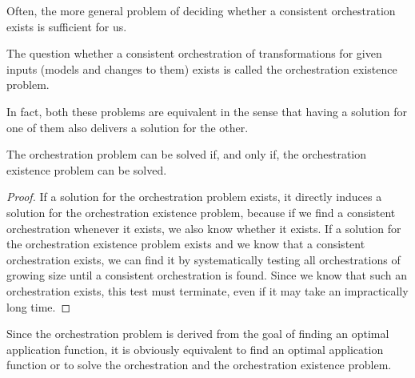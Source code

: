 Often, the more general problem of deciding whether a consistent orchestration exists is sufficient for us.
\begin{definition}
    \label{def:orchestrationexistenceproblem}
    The question whether a consistent orchestration of transformations for given inputs (models and changes to them) exists is called the orchestration existence problem.
\end{definition}

In fact, both these problems are equivalent in the sense that having a solution for one of them also delivers a solution for the other.
\begin{theorem}
    \label{theorem:orchestrationproblemequivalence}
    The orchestration problem can be solved if, and only if, the orchestration existence problem can be solved.
\end{theorem}
\begin{proof}
    If a solution for the orchestration problem exists, it directly induces a solution for the orchestration existence problem, because if we find a consistent orchestration whenever it exists, we also know whether it exists.
    If a solution for the orchestration existence problem exists and we know that a consistent orchestration exists, we can find it by systematically testing all orchestrations of growing size until a consistent orchestration is found. Since we know that such an orchestration exists, this test must terminate, even if it may take an impractically long time.
\end{proof}

Since the orchestration problem is derived from the goal of finding an optimal application function, it is obviously equivalent to find an optimal application function or to solve the orchestration and the orchestration existence problem.

